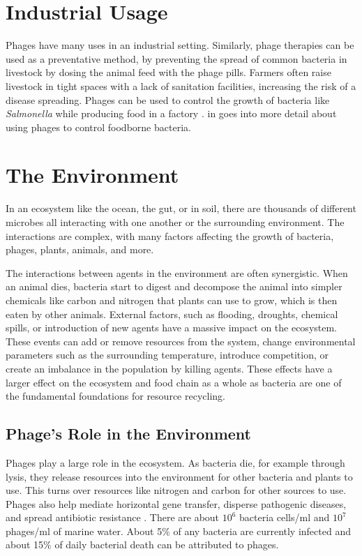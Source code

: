 \section{Industrial Usage}
Phages have many uses in an industrial setting. 
Similarly, phage therapies can be used as a preventative method, by preventing the spread of common bacteria in livestock by dosing the animal feed with the phage pills. 
Farmers often raise livestock in tight spaces with a lack of sanitation facilities, increasing the risk of a disease spreading. \newline 
Phages can be used to control the growth of bacteria like \textit{Salmonella} while producing food in a factory \cite{sofferBacteriophagesSafelyReduce2016, kowalskaFreshVegetablesFruit2023}. 
 in  goes into more detail about using phages to control foodborne bacteria. 

\section{The Environment}
In an ecosystem like the ocean, the gut, or in soil, there are thousands of different microbes all interacting with one another or the surrounding environment.
The interactions are complex, with many factors affecting the growth of bacteria, phages, plants, animals, and more. 

The interactions between agents in the environment are often synergistic. 
When an animal dies, bacteria start to digest and decompose the animal into simpler chemicals like carbon and nitrogen that plants can use to grow, which is then eaten by other animals. 
External factors, such as flooding, droughts, chemical spills, or introduction of new agents have a massive impact on the ecosystem. 
These events can add or remove resources from the system, change environmental parameters such as the surrounding temperature, introduce competition, or create an imbalance in the population by killing agents. 
These effects have a larger effect on the ecosystem and food chain as a whole as bacteria are one of the fundamental foundations for resource recycling. 

\subsection{Phage's Role in the Environment}
Phages play a large role in the ecosystem. 
As bacteria die, for example through lysis, they release resources into the environment for other bacteria and plants to use. 
This turns over resources like nitrogen and carbon for other sources to use. 
Phages also help mediate horizontal gene transfer, disperse pathogenic diseases, and spread antibiotic resistance \cite{al-shayebCladesHugePhages2020}. 
There are about $10^6$ bacteria cells/ml and $10^7$ phages/ml of marine water. 
About 5\% of any bacteria are currently infected and about 15\% of daily bacterial death can be attributed to phages\cite{chibani-chennoufiPhageHostInteractionEcological2004}. 

